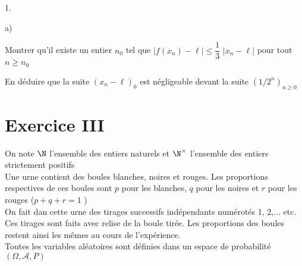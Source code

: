 \documentclass[11pt]{article}%
\begin{document}
\begin{noliste}{1.}
\begin{noliste}{a)}
 \setlength{\itemsep}{2mm}
\item Montrer qu'il existe un entier $n_{0}$ tel que $\left| f\left(
x_{n}\right) -\ell \right| \leq \dfrac{1}{3}$ $\left| x_{n}-\ell
\right| $
pour tout $n\geq n_{0}$

\item En déduire que la suite $\left( x_{n}-\ell \right)_{0}$ est
négligeable devant la suite $\left( 1/2^{n}\right)_{n\geq 0}$
\end{noliste}
\end{noliste}

\section*{Exercice III}

On note $\N$ l'ensemble des entiers naturels et $\N^{\times }
$ l'ensemble des entiers strictement positifs\\
Une urne contient des boules blanches, noires et rouges. Les
proportions
respectives de ces boules sont $p$ pour les blanches, $q$ pour les
noires et 
$r$ pour les rouges ($p + q + r = 1$ )\\
On fait dan cette urne des tirages successifs indépendants numérotés 1,
2,... etc. Ces tirages sont faits avec relise de la boule tirée. Les
proportions des boules restent ainsi les mêmes au cours de
l'expérience.\\
Toutes les variables aléatoires sont définies dans un espace de
probabilité $\left( \Omega,\mathcal{A},P\right) $
\end{document}
